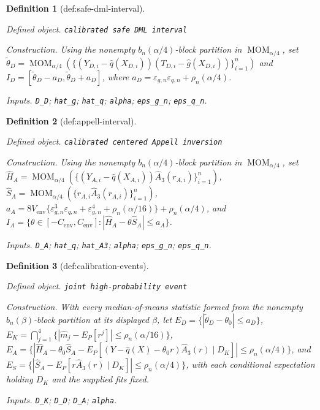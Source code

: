 \documentclass{article}
\newtheorem{definition}{Definition}
\begin{document}
\begin{definition}[def:safe-dml-interval]\label{def:safe-dml-interval}
\par\smallskip\noindent\emph{Defined object.} \texttt{calibrated safe DML interval}
\par\smallskip\noindent\emph{Construction.} Using the nonempty \(b_n(\alpha/4)\)-block partition in \(\operatorname{MOM}_{\alpha/4}\), set \(\widetilde\theta_D=\operatorname{MOM}_{\alpha/4}(\{(Y_{D,i}-\widehat q(X_{D,i}))(T_{D,i}-\widehat g(X_{D,i}))\}_{i=1}^n)\) and \(I_D=[\widetilde\theta_D-a_D,\widetilde\theta_D+a_D]\), where \(a_D=\varepsilon_{g,n}\varepsilon_{q,n}+\rho_n(\alpha/4)\).
\par\smallskip\noindent\emph{Inputs.} \texttt{D\_\allowbreak{}D}; \texttt{hat\_\allowbreak{}g}; \texttt{hat\_\allowbreak{}q}; \texttt{alpha}; \texttt{eps\_\allowbreak{}g\_\allowbreak{}n}; \texttt{eps\_\allowbreak{}q\_\allowbreak{}n}.
\end{definition}

\begin{definition}[def:appell-interval]\label{def:appell-interval}
\par\smallskip\noindent\emph{Defined object.} \texttt{calibrated centered Appell inversion}
\par\smallskip\noindent\emph{Construction.} Using the nonempty \(b_n(\alpha/4)\)-block partition in \(\operatorname{MOM}_{\alpha/4}\), set \(\widehat H_A=\operatorname{MOM}_{\alpha/4}(\{(Y_{A,i}-\widehat q(X_{A,i}))\widehat A_3(r_{A,i})\}_{i=1}^n)\), \(\widehat S_A=\operatorname{MOM}_{\alpha/4}(\{r_{A,i}\widehat A_3(r_{A,i})\}_{i=1}^n)\), \(a_A=8V_{\mathrm{env}}\{\varepsilon_{g,n}^3\varepsilon_{q,n}+\varepsilon_{g,n}^4+\rho_n(\alpha/16)\}+\rho_n(\alpha/4)\), and \(I_A=\{\theta\in[-C_{\mathrm{env}},C_{\mathrm{env}}]:|\widehat H_A-\theta\widehat S_A|\le a_A\}\).
\par\smallskip\noindent\emph{Inputs.} \texttt{D\_\allowbreak{}A}; \texttt{hat\_\allowbreak{}q}; \texttt{hat\_\allowbreak{}A3}; \texttt{alpha}; \texttt{eps\_\allowbreak{}g\_\allowbreak{}n}; \texttt{eps\_\allowbreak{}q\_\allowbreak{}n}.
\end{definition}

\begin{definition}[def:calibration-events]\label{def:calibration-events}
\par\smallskip\noindent\emph{Defined object.} \texttt{joint high-\allowbreak{}probability event}
\par\smallskip\noindent\emph{Construction.} With every median-of-means statistic formed from the nonempty \(b_n(\beta)\)-block partition at its displayed \(\beta\), let \(E_D=\{|\widetilde\theta_D-\theta_0|\le a_D\}\), \(E_K=\bigcap_{j=1}^4\{|\widehat m_j-E_P[r^j]|\le\rho_n(\alpha/16)\}\), \(E_A=\{|\widehat H_A-\theta_0\widehat S_A-E_P[(Y-\widehat q(X)-\theta_0r)\widehat A_3(r)\mid D_K]|\le\rho_n(\alpha/4)\}\), and \(E_S=\{|\widehat S_A-E_P[r\widehat A_3(r)\mid D_K]|\le\rho_n(\alpha/4)\}\), with each conditional expectation holding \(D_K\) and the supplied fits fixed.
\par\smallskip\noindent\emph{Inputs.} \texttt{D\_\allowbreak{}K}; \texttt{D\_\allowbreak{}D}; \texttt{D\_\allowbreak{}A}; \texttt{alpha}.
\end{definition}
\end{document}
